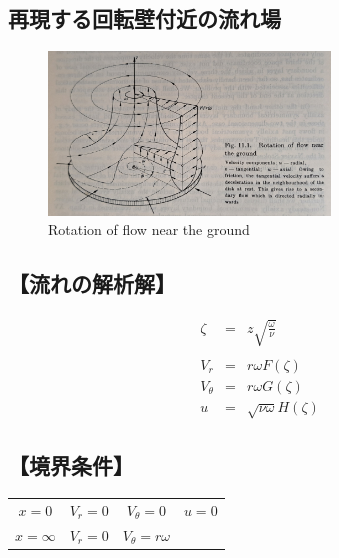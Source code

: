 \documentclass[twocolumn,a4j]{jsarticle}
\begin{document}
\subsection{再現する回転壁付近の流れ場}
\begin{figure}[htbp]
  \footnotesize
  \begin{center}
    \includegraphics[width=75mm]{../images/Boundary-Layer_Theory_Fig.11.1.jpg}
    \caption{Rotation of flow near the ground}
  \end{center}
\end{figure}

\newpage

\subsection*{【流れの解析解】}
\begin{eqnarray*}
  \zeta &=& z \sqrt{\frac{\omega}{\nu}}\\
  \\
  V_r &=& r \omega F \left(\zeta\right)\\
  V_\theta &=& r \omega G \left(\zeta\right)\\
  u &=& \sqrt{\nu \omega} H \left(\zeta\right)
\end{eqnarray*}

\subsection*{【境界条件】}
\begin{table}[hbtp]
  \centering
  \begin{tabular}{ c c c c }
    $x=0$      & $V_r=0$ & $V_\theta =0$        & $u=0$ \\
    $x=\infty$ & $V_r=0$ & $V_\theta =r \omega$ &       \\
  \end{tabular}
\end{table}
\end{document}
